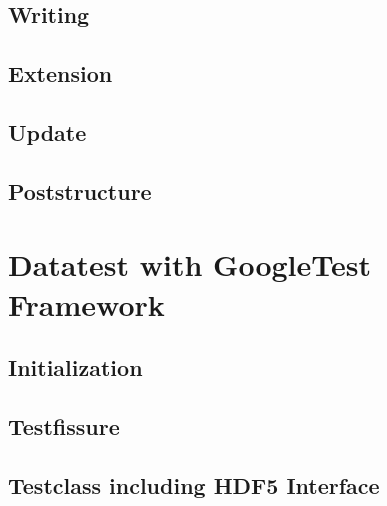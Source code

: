 \documentclass{article}
\begin{document}
\subsection{Writing}

\subsection{Extension}

\subsection{Update}



\subsection{Poststructure}



\section{Datatest with GoogleTest Framework}
\subsection{Initialization}
\subsection{Testfissure}
\subsection{Testclass including HDF5 Interface}






\end{document}
